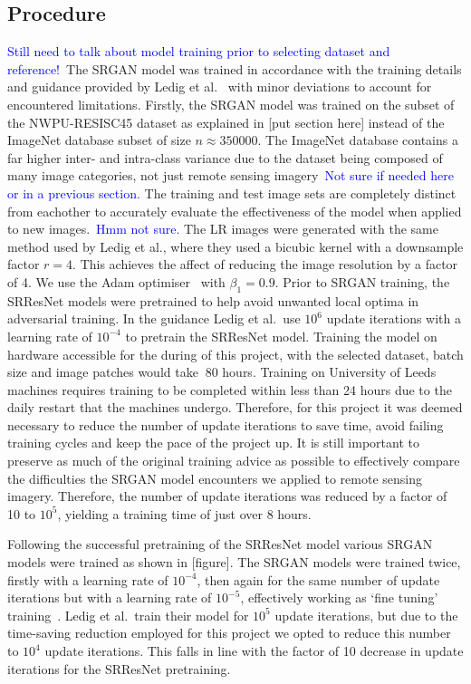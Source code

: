 \subsection{Procedure}
\textcolor{blue}{Still need to talk about model training prior to selecting dataset and reference!}\ The SRGAN model was trained in accordance with the training details and guidance provided by Ledig et al.~\cite{srgan} with minor deviations to account for encountered limitations. Firstly, the SRGAN model was trained on the subset of the NWPU-RESISC45 dataset as explained in [put section here] instead of the ImageNet database subset of size $n \approx 350000$. The ImageNet database contains a far higher inter- and intra-class variance due to the dataset being composed of many image categories, not just remote sensing imagery\ \textcolor{blue}{Not sure if needed here or in a previous section.} The training and test image sets are completely distinct from eachother to accurately evaluate the effectiveness of the model when applied to new images.\ \textcolor{blue}{Hmm not sure.} The LR images were generated with the same method used by Ledig et al., where they used a bicubic kernel with a downsample factor $r=4$. This achieves the affect of reducing the image resolution by a factor of 4. We use the Adam optimiser~\cite{ref} with $\beta_1 = 0.9$. Prior to SRGAN training, the SRResNet models were pretrained to help avoid unwanted local optima in adversarial training. In the guidance Ledig et al.\ use $10^6$ update iterations with a learning rate of $10^{-4}$ to pretrain the SRResNet model. Training the model on hardware accessible for the during of this project, with the selected dataset, batch size and image patches would take $~80$ hours. Training on University of Leeds machines requires training to be completed within less than 24 hours due to the daily restart that the machines undergo. Therefore, for this project it was deemed necessary to reduce the number of update iterations to save time, avoid failing training cycles and keep the pace of the project up. It is still important to preserve as much of the original training advice as possible to effectively compare the difficulties the SRGAN model encounters we applied to remote sensing imagery. Therefore, the number of update iterations was reduced by a factor of 10 to $10^5$, yielding a training time of just over 8 hours.

Following the successful pretraining of the SRResNet model various SRGAN models were trained as shown in [figure]. The SRGAN models were trained twice, firstly with a learning rate of $10^{-4}$, then again for the same number of update iterations but with a learning rate of $10^{-5}$, effectively working as `fine tuning' training~\cite{srgan}. Ledig et al.\ train their model for $10^5$ update iterations, but due to the time-saving reduction employed for this project we opted to reduce this number to $10^4$ update iterations. This falls in line with the factor of 10 decrease in update iterations for the SRResNet pretraining.

